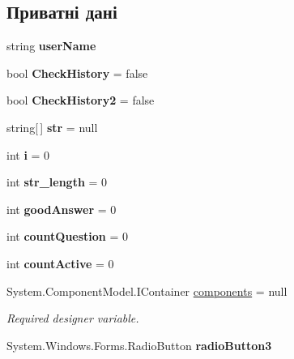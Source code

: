 \subsection*{Приватні дані}
\begin{DoxyCompactItemize}
\item 
string {\bfseries user\+Name}\hypertarget{class_tests_1_1_form2_a94345348b49022de721b18d56a6ee69c}{}\label{class_tests_1_1_form2_a94345348b49022de721b18d56a6ee69c}

\item 
bool {\bfseries Check\+History} = false\hypertarget{class_tests_1_1_form2_a54e155db1ad24014b42f57316c451c8e}{}\label{class_tests_1_1_form2_a54e155db1ad24014b42f57316c451c8e}

\item 
bool {\bfseries Check\+History2} = false\hypertarget{class_tests_1_1_form2_a3757cb2e88f63fcddc6eafa8875d8083}{}\label{class_tests_1_1_form2_a3757cb2e88f63fcddc6eafa8875d8083}

\item 
string\mbox{[}$\,$\mbox{]} {\bfseries str} = null\hypertarget{class_tests_1_1_form2_aac5d2866823577cccc4ca0a8442d2482}{}\label{class_tests_1_1_form2_aac5d2866823577cccc4ca0a8442d2482}

\item 
int {\bfseries i} = 0\hypertarget{class_tests_1_1_form2_ad5c917043831c5e2e149a3f4c97c6bec}{}\label{class_tests_1_1_form2_ad5c917043831c5e2e149a3f4c97c6bec}

\item 
int {\bfseries str\+\_\+length} = 0\hypertarget{class_tests_1_1_form2_a02950f1d6c4e43ab053c7b7aaeea873c}{}\label{class_tests_1_1_form2_a02950f1d6c4e43ab053c7b7aaeea873c}

\item 
int {\bfseries good\+Answer} = 0\hypertarget{class_tests_1_1_form2_aa3d211b0601b3563a317d4af624ad95a}{}\label{class_tests_1_1_form2_aa3d211b0601b3563a317d4af624ad95a}

\item 
int {\bfseries count\+Question} = 0\hypertarget{class_tests_1_1_form2_aa39ae1a993f54362add54ef965ceeb3d}{}\label{class_tests_1_1_form2_aa39ae1a993f54362add54ef965ceeb3d}

\item 
int {\bfseries count\+Active} = 0\hypertarget{class_tests_1_1_form2_aa30b67a81604acf594bc26419d249f6f}{}\label{class_tests_1_1_form2_aa30b67a81604acf594bc26419d249f6f}

\item 
System.\+Component\+Model.\+I\+Container \hyperlink{class_tests_1_1_form2_a7d07edf4796d9dc60c94c70eefc79d72}{components} = null
\begin{DoxyCompactList}\small\item\em Required designer variable. \end{DoxyCompactList}\item 
System.\+Windows.\+Forms.\+Radio\+Button {\bfseries radio\+Button3}\hypertarget{class_tests_1_1_form2_aab1e99a28aeebaacbd56f13e46f7e276}{}\label{class_tests_1_1_form2_aab1e99a28aeebaacbd56f13e46f7e276}


\end{DoxyCompactItemize}
